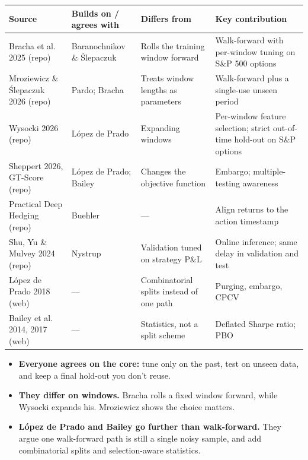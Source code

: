 \documentclass{article}
\begin{document}
\begin{center}\small
\begin{tabularx}{\linewidth}{>{\raggedright\arraybackslash}X >{\raggedright\arraybackslash}X >{\raggedright\arraybackslash}X >{\raggedright\arraybackslash}X}
\toprule
\textbf{Source} & \textbf{Builds on /\allowbreak{} agrees with} & \textbf{Differs from} & \textbf{Key contribution} \\
\midrule
Bracha et al. 2025 (repo) & Baranochnikov \& \'{S}lepaczuk & Rolls the training window forward & Walk-forward with per-window tuning on S\&P 500 options \\
Mroziewicz \& \'{S}lepaczuk 2026 (repo) & Pardo; Bracha & Treats window lengths as parameters & Walk-forward plus a single-use unseen period \\
Wysocki 2026 (repo) & López de Prado & Expanding windows & Per-window feature selection; strict out-of-time hold-out on S\&P options \\
Sheppert 2026, GT-Score (repo) & López de Prado; Bailey & Changes the objective function & Embargo; multiple-testing awareness \\
Practical Deep Hedging (repo) & Buehler & --- & Align returns to the action timestamp \\
Shu, Yu \& Mulvey 2024 (repo) & Nystrup & Validation tuned on strategy P\&L & Online inference; same delay in validation and test \\
López de Prado 2018 (web) & --- & Combinatorial splits instead of one path & Purging, embargo, CPCV \\
Bailey et al. 2014, 2017 (web) & --- & Statistics, not a split scheme & Deflated Sharpe ratio; PBO \\
\bottomrule
\end{tabularx}
\end{center}

\begin{itemize}

\item \textbf{Everyone agrees on the core:} tune only on the past, test on unseen data, and keep a final hold-out you don't reuse.

\item \textbf{They differ on windows.} Bracha rolls a fixed window forward, while Wysocki expands his. Mroziewicz shows the choice matters.

\item \textbf{López de Prado and Bailey go further than walk-forward.} They argue one walk-forward path is still a single noisy sample, and add combinatorial splits and selection-aware statistics.

\end{itemize}
\end{document}
